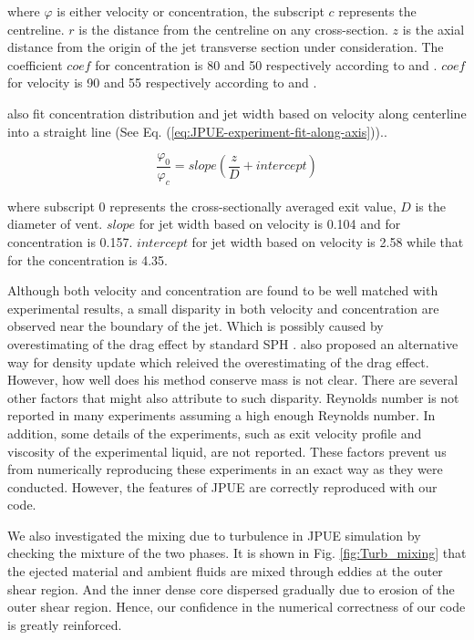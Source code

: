 \documentclass[gmd, manuscript]{copernicus}
\begin{document}
where $\varphi$ is either velocity or concentration, the subscript $c$ represents the centreline. $r$ is the distance from the centreline on any cross-section. $z$ is the axial distance from the origin of the jet transverse section under consideration. 
The coefficient $coef$ for concentration is 80 and 50 respectively according to \citet{george1977turbulence} and \citet{papanicolaou1988investigations}.
$coef$ for velocity is 90 and 55 respectively according to \citet{george1977turbulence} and \citet{papanicolaou1988investigations}. 

\citet{papanicolaou1988investigations} also fit concentration distribution and jet width based on velocity along centerline into a straight line (See Eq. (\ref{eq:JPUE-experiment-fit-along-axis})).. 

\begin{equation}
\dfrac{\varphi_0}{\varphi_c}=slope \left(\dfrac{z}{D} + intercept \right)
\label{eq:JPUE-experiment-fit-along-axis}
\end{equation}

where subscript $0$ represents the cross-sectionally averaged exit value, $D$ is the diameter of vent. 
$slope$ for jet width based on velocity is 0.104 and for concentration is 0.157. 
$intercept$ for jet width based on velocity is 2.58 while that for the concentration is 4.35.

Although both velocity and concentration are found to be well matched with experimental results, a small disparity in both velocity and concentration are observed near the boundary of the jet. Which is possibly caused by overestimating of the drag effect by standard SPH \citep {ritchie2001multiphase}. \citet {ritchie2001multiphase} also proposed an alternative way for density update which releived the overestimating of the drag effect. However, how well does his method conserve mass is not clear. There are several other factors that might also attribute to such disparity. Reynolds number is not reported in many experiments assuming a high enough Reynolds number. In addition, some details of the experiments, such as exit velocity profile and viscosity of the experimental liquid, are not reported. These factors prevent us from numerically reproducing these experiments in an exact way as they were conducted. However, the features of JPUE are correctly reproduced with our code.

We also investigated the mixing due to turbulence in JPUE simulation by checking the mixture of the two phases. It is shown in Fig. \ref{fig:Turb_mixing} that the ejected material and ambient fluids are mixed through eddies at the outer shear region. And the inner dense core dispersed gradually due to erosion of the outer shear region. Hence, our confidence in the numerical correctness of our code is greatly reinforced.
\end{document}
